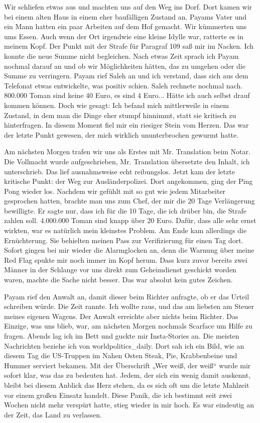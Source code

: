 Wir schliefen etwas aus und machten uns auf den Weg ins Dorf. Dort kamen wir bei einem alten Haus in einem eher baufälligen Zustand an. Payams Vater und ein Mann hatten ein paar Arbeiten auf dem Hof gemacht. Wir kümmerten uns ums Essen. Auch wenn der Ort irgendwie eine kleine Idylle war, ratterte es in meinem Kopf. Der Punkt mit der Strafe für Paragraf 109 saß mir im Nacken. Ich konnte die neue Summe nicht begleichen. Nach etwas Zeit sprach ich Payam nochmal darauf an und ob wir Möglichkeiten hätten, das zu umgehen oder die Summe zu verringern. Payam rief Saleh an und ich verstand, dass sich aus dem Telefonat etwas entwickelte, was positiv schien. Saleh rechnete nochmal nach. 800.000 Toman sind keine 40 Euro, es sind 4 Euro... Hätte ich auch selbst drauf kommen können. Doch wie gesagt: Ich befand mich mittlerweile in einem Zustand, in dem man die Dinge eher stumpf hinnimmt, statt sie kritisch zu hinterfragen. In diesem Moment fiel mir ein riesiger Stein vom Herzen. Das war der letzte Punkt gewesen, der mich wirklich ununterbrochen gewurmt hatte.

Am nächsten Morgen trafen wir uns als Erstes mit Mr. Translation beim Notar. Die Vollmacht wurde aufgeschrieben, Mr. Translation übersetzte den Inhalt, ich unterschrieb. Das lief ausnahmsweise echt reibungslos. Jetzt kam der letzte kritische Punkt: der Weg zur Ausländerpolizei. Dort angekommen, ging der Ping Pong wieder los. Nachdem wir gefühlt mit so gut wie jedem Mitarbeiter gesprochen hatten, brachte man uns zum Chef, der mir die 20 Tage Verlängerung bewilligte. Er sagte nur, dass ich für die 10 Tage, die ich drüber bin, die Strafe zahlen soll. 4.000.000 Toman sind knapp über 20 Euro. Dafür, dass alle sehr ernst wirkten, war es natürlich mein kleinstes Problem. Am Ende kam allerdings die Ernüchterung. Sie behielten meinen Pass zur Verifizierung für einen Tag dort. Sofort gingen bei mir wieder die Alarmglocken an, denn die Warnung über meine Red Flag spukte mir noch immer im Kopf herum. Dass kurz zuvor bereits zwei Männer in der Schlange vor uns direkt zum Geheimdienst geschickt worden waren, machte die Sache nicht besser. Das war absolut kein gutes Zeichen.

Payam rief den Anwalt an, damit dieser beim Richter anfragte, ob er das Urteil schreiben würde. Die Zeit rannte. Ich wollte raus, und das am liebsten am Steuer meines eigenen Wagens. Der Anwalt erreichte aber nichts beim Richter. Das Einzige, was uns blieb, war, am nächsten Morgen nochmals Scarface um Hilfe zu fragen. Abends lag ich im Bett und guckte mir Insta-Stories an. Die meisten Nachrichten beziehe ich von worldpolitics\_daily. Dort sah ich ein Bild, wie an diesem Tag die US-Truppen im Nahen Osten Steak, Pie, Krabbenbeine und Hummer serviert bekamen. Mit der Überschrift „Wer weiß, der weiß“ wurde mir sofort klar, was das zu bedeuten hat. Jedem, der sich ein wenig damit auskennt, bleibt bei diesem Anblick das Herz stehen, da es sich oft um die letzte Mahlzeit vor einem großen Einsatz handelt. Diese Panik, die ich bestimmt seit zwei Wochen nicht mehr verspürt hatte, stieg wieder in mir hoch. Es war eindeutig an der Zeit, das Land zu verlassen.

